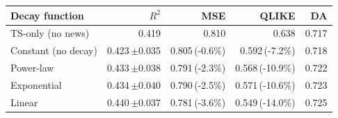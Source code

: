 \begin{tabular}{lrrrr}
\toprule
Decay function & $R^2$ & MSE & QLIKE & DA \\
\midrule
TS-only (no news) & 0.419 & 0.810 & 0.638 & 0.717 \\
Constant (no decay) & 0.423\,$\pm$0.035 & 0.805\,(-0.6\%) & 0.592\,(-7.2\%) & 0.718 \\
Power-law & 0.433\,$\pm$0.038 & 0.791\,(-2.3\%) & 0.568\,(-10.9\%) & 0.722 \\
Exponential & 0.434\,$\pm$0.040 & 0.790\,(-2.5\%) & 0.571\,(-10.6\%) & 0.723 \\
Linear & 0.440\,$\pm$0.037 & 0.781\,(-3.6\%) & 0.549\,(-14.0\%) & 0.725 \\
\bottomrule
\end{tabular}
